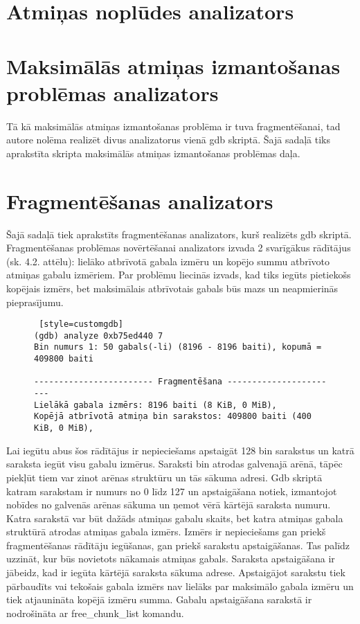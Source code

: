\section{Atmiņas noplūdes analizators}

\section{Maksimālās atmiņas izmantošanas problēmas analizators}
Tā kā maksimālās atmiņas izmantošanas problēma ir tuva fragmentēšanai, tad autore nolēma realizēt divus analizatorus vienā gdb skriptā.
Šajā sadaļā tiks aprakstīta skripta maksimālās atmiņas izmantošanas problēmas daļa.


\section{Fragmentēšanas analizators}
Šajā sadaļā tiek aprakstīts fragmentēšanas analizators, kurš realizēts gdb skriptā.
Fragmentēšanas problēmas novērtēšanai analizators izvada 2 svarīgākus rādītājus (sk. 4.2. attēlu): lielāko atbrīvotā gabala izmēru un kopējo summu atbrīvoto atmiņas gabalu izmēriem.
Par problēmu liecinās izvads, kad tiks iegūts pietiekošs kopējais izmērs, bet maksimālais atbrīvotais gabals būs mazs un neapmierinās pieprasījumu.

\begin{figure}[h]
\begin{lstlisting} [style=customgdb]
(gdb) analyze 0xb75ed440 7
Bin numurs 1: 50 gabals(-li) (8196 - 8196 baiti), kopumā = 409800 baiti

------------------------ Fragmentēšana -----------------------
Lielākā gabala izmērs: 8196 baiti (8 KiB, 0 MiB),
Kopējā atbrīvotā atmiņa bin sarakstos: 409800 baiti (400 KiB, 0 MiB),
\end{lstlisting}
\caption{\textbf{\fontsize{11}{12}\selectfont {Fragmentēšanas rādītāji}}}
\end{figure}

Lai iegūtu abus šos rādītājus ir nepieciešams apstaigāt 128 bin sarakstus un katrā saraksta iegūt visu gabalu izmērus.
Saraksti bin atrodas galvenajā arēnā, tāpēc piekļūt tiem var zinot arēnas struktūru un tās sākuma adresi.
Gdb skriptā katram sarakstam ir numurs no 0 līdz 127 un apstaigāšana notiek, izmantojot nobīdes no galvenās arēnas sākuma un ņemot vērā kārtējā saraksta numuru.
Katra sarakstā var būt dažāds atmiņas gabalu skaits, bet katra atmiņas gabala struktūrā atrodas atmiņas gabala izmērs.
Izmērs ir nepieciešams gan priekš fragmentēšanas rādītāju iegūšanas, gan priekš sarakstu apstaigāšanas. 
Tas palīdz uzzināt, kur būs novietots nākamais atmiņas gabals.
Saraksta apstaigāšana ir jābeidz, kad ir iegūta kārtējā saraksta sākuma adrese.
Apstaigājot sarakstu tiek pārbaudīts vai tekošais gabala izmērs nav lielāks par maksimālo gabala izmēru un tiek atjaunināta kopējā izmēru summa.
Gabalu apstaigāšana sarakstā ir nodrošināta ar free\_chunk\_list komandu.

